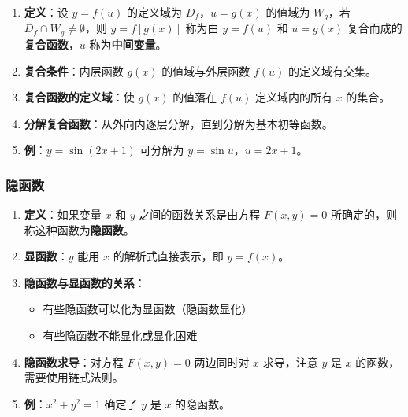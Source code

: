 \documentclass[../book.tex]{subfiles}
\begin{document}
    \begin{enumerate}
        \item \textbf{定义}：设 $y = f(u)$ 的定义域为 $D_f$，$u = g(x)$ 的值域为 $W_g$，若 $D_f \cap W_g \neq \emptyset$，则 $y = f[g(x)]$ 称为由 $y = f(u)$ 和 $u = g(x)$ 复合而成的\textbf{复合函数}，$u$ 称为\textbf{中间变量}。

        \item \textbf{复合条件}：内层函数 $g(x)$ 的值域与外层函数 $f(u)$ 的定义域有交集。

        \item \textbf{复合函数的定义域}：使 $g(x)$ 的值落在 $f(u)$ 定义域内的所有 $x$ 的集合。

        \item \textbf{分解复合函数}：从外向内逐层分解，直到分解为基本初等函数。

        \item \textbf{例}：$y = \sin(2x + 1)$ 可分解为 $y = \sin u$，$u = 2x + 1$。
    \end{enumerate}

    \subsubsection{隐函数}

    \begin{enumerate}
        \item \textbf{定义}：如果变量 $x$ 和 $y$ 之间的函数关系是由方程 $F(x, y) = 0$ 所确定的，则称这种函数为\textbf{隐函数}。

        \item \textbf{显函数}：$y$ 能用 $x$ 的解析式直接表示，即 $y = f(x)$。

        \item \textbf{隐函数与显函数的关系}：
        \begin{itemize}
            \item 有些隐函数可以化为显函数（隐函数显化）
            \item 有些隐函数不能显化或显化困难
        \end{itemize}

        \item \textbf{隐函数求导}：对方程 $F(x, y) = 0$ 两边同时对 $x$ 求导，注意 $y$ 是 $x$ 的函数，需要使用链式法则。

        \item \textbf{例}：$x^2 + y^2 = 1$ 确定了 $y$ 是 $x$ 的隐函数。
    \end{enumerate}
\end{document}
